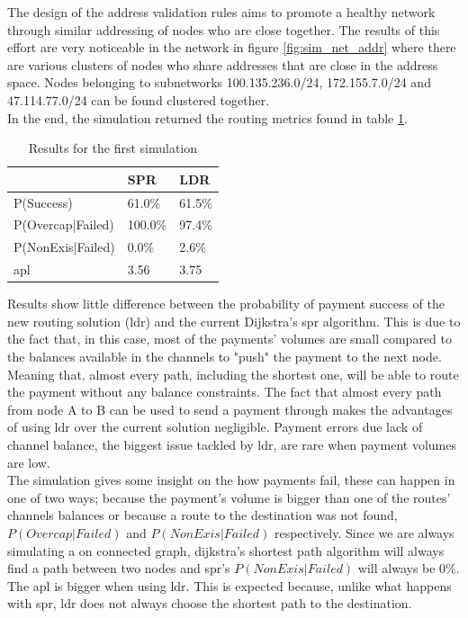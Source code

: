 The design of the address validation rules aims to promote a healthy network through similar addressing of nodes who are close together. The results of this effort are very noticeable in the network in figure \ref{fig:sim_net_addr} where there are various clusters of nodes who share addresses that are close in the address space. Nodes belonging to subnetworks 100.135.236.0/24, 172.155.7.0/24 and 47.114.77.0/24 can be found clustered together.\\
In the end, the simulation returned the routing metrics found in table \ref{table:simulation_results1}.

\begin{table}[H]
\begin{tabular}{l|l|l|}
\cline{2-3}
\rowcolor[HTML]{C0C0C0} 
\cellcolor[HTML]{FFFFFF}                  & SPR     & LDR    \\ \hline
\multicolumn{1}{|l|}{P(Success)}          & 61.0\%  & 61.5\% \\ \hline
\multicolumn{1}{|l|}{P(Overcap|Failed)}   & 100.0\% & 97.4\% \\ \hline
\multicolumn{1}{|l|}{P(NonExis|Failed)}   & 0.0\%   & 2.6\%  \\ \hline
\multicolumn{1}{|l|}{\acrshort{apl}} & 3.56    & 3.75   \\ \hline
\end{tabular}
\caption{Results for the first simulation}
\label{table:simulation_results1}
\end{table}

Results show little difference between the probability of payment success of the new routing solution (\acrshort{ldr}) and the current Dijkstra's \acrfull{spr} algorithm. This is due to the fact that, in this case, most of the payments' volumes are small compared to the balances available in the channels to "push" the payment to the next node. Meaning that, almost every path, including the shortest one, will be able to route the payment without any balance constraints. The fact that almost every path from node A to B can be used to send a payment through makes the advantages of using \acrshort{ldr} over the current solution negligible. Payment errors due lack of channel balance, the biggest issue tackled by \acrshort{ldr}, are rare when payment volumes are low.\\
The simulation gives some insight on the how payments fail, these can happen in one of two ways; because the payment's volume is bigger than one of the routes' channels balances or because a route to the destination was not found, $P(Overcap|Failed)$ and $P(NonExis|Failed)$ respectively. Since we are always simulating a on connected graph, dijkstra's shortest path algorithm will always find a path between two nodes and \acrshort{spr}'s $P(NonExis|Failed)$ will always be 0\%.\\
The \acrfull{apl} is bigger when using \acrshort{ldr}. This is expected because, unlike what happens with \acrshort{spr}, \acrshort{ldr} does not always choose the shortest path to the destination.

